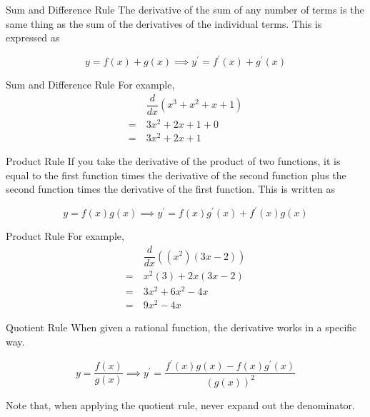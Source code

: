 \begin{rules}{Sum and Difference Rule}
    The derivative of the sum of any number of terms is the same thing as the sum of the derivatives of the individual terms. This is expressed as
    
    \[ y = f \left( x \right) + g \left( x \right) \implies y^\prime = f^\prime \left( x \right) + g^\prime \left( x \right) \]
\end{rules}

\begin{example}{Sum and Difference Rule}
    For example, 
    \begin{align*}
        &\dfrac{d}{dx} \left( x^3 + x^2 + x + 1 \right) \\
        = \> &3x^2 + 2x + 1 + 0 \\
        = \> &3x^2 + 2x + 1
    \end{align*}
\end{example}

\begin{rules}{Product Rule}
    If you take the derivative of the product of two functions, it is equal to the first function times the derivative of the second function plus the second function times the derivative of the first function. This is written as
    
    \[ y = f \left( x \right) g \left( x \right) \implies y^\prime = f \left( x \right) g^\prime \left( x \right) + f^\prime \left( x \right) g \left( x \right) \]
\end{rules}

\begin{example}{Product Rule}
    For example, 
    \begin{align*}
        &\dfrac{d}{dx} \left( \left( x^2 \right) \left( 3x - 2 \right) \right) \\
        = \> &x^2 \left( 3 \right) + 2x \left( 3x - 2 \right) \\
        = \> &3x^2 + 6x^2 - 4x \\
        = \> &9x^2 - 4x
    \end{align*}
\end{example}

\begin{rules}{Quotient Rule}
    When given a rational function, the derivative works in a specific way.
    
    \[ y = \dfrac{f \left( x \right)}{g \left( x \right)} \implies y^\prime = \dfrac{f^\prime \left( x \right) g \left( x \right) - f \left( x \right) g^\prime \left( x \right)}{\left( g \left( x \right) \right)^2 } \]
    
    Note that, when applying the quotient rule, never expand out the denominator.
\end{rules}

